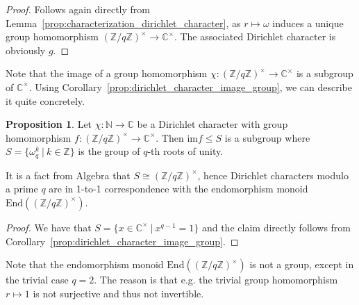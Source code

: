 \documentclass{scrartcl}
\newcommand{\N}{\mathbb{N}}
\newcommand{\Z}{\mathbb{Z}}
\newcommand{\C}{\mathbb{C}}
\newcommand{\units}{\times}
\theoremstyle{definition}
\newtheorem{proposition}[definition]{Proposition}
\begin{document}
\begin{proof}
    Follows again directly from Lemma~\ref{prop:characterization_dirichlet_character}, as $r \mapsto \omega$ induces a unique group homomorphism $(\Z/q\Z)^\units \to \C^\units$.
    The associated Dirichlet character is obviously $g$.
\end{proof}
Note that the image of a group homomorphism $\chi: (\Z/q\Z)^\units \to \C^\units$ is a subgroup of $\C^\units$.
Using Corollary~\ref{prop:dirichlet_character_image_group}, we can describe it quite concretely.
\begin{proposition}
    Let $\chi: \N \to \C$ be a Dirichlet character with group homomorphism $f: (\Z/q\Z)^\units \to \C^\units$.
    Then $\mathrm{im}f \leq S$ is a subgroup where $S = \{ \omega_q^k \ | \ k \in \Z \}$ is the group of $q$-th roots of unity.
    
    It is a fact from Algebra that $S \cong (\Z/q\Z)^\units$, hence Dirichlet characters modulo a prime $q$ are in 1-to-1 correspondence with the endomorphism monoid $\mathrm{End}((\Z/q\Z)^\units)$.
\end{proposition}
\begin{proof}
    We have that $S = \{ x \in \C^\units \ | \ x^{q - 1} = 1 \}$ and the claim directly follows from Corollary~\ref{prop:dirichlet_character_image_group}.
\end{proof}
Note that the endomorphism monoid $\mathrm{End}((\Z/q\Z)^\units)$ is not a group, except in the trivial case $q = 2$.
The reason is that e.g. the trivial group homomorphism $r \mapsto 1$ is not surjective and thus not invertible.
\end{document}
